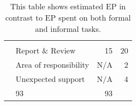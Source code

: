 \begin{table}[h]
\begin{tabular}{llrr}
        \tblgrpsep                                                                       
        \multicolumn{2}{l}{Informal tasks}									             \\
        \cline{1-2}                                                                      
        &Report \& Review                                            & 15         & 20   \\
        &Area of responsibility                                      & N/A        & 2    \\
        &Unexpected support                                          & N/A        & 4    \\
        \tblgrpsep                                                                       
        \midrule                                                                         
        \multicolumn{2}{l}{Total}                                    & 93         & 93   \\
    \end{tabular}
    \caption{This table shows estimated EP in contrast to EP spent on both formal and informal tasks.}\label{tab:sprint1tasktable}
\end{table}